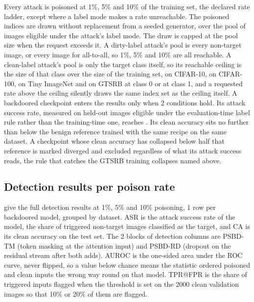 Every attack is poisoned at 1\%, 5\% and 10\% of the training set, the declared rate ladder, except where a label mode makes a rate unreachable. The poisoned indices are drawn without replacement from a seeded generator, over the pool of images eligible under the attack's label mode. The draw is capped at the pool size when the request exceeds it. A dirty-label attack's pool is every non-target image, or every image for all-to-all, so 1\%, 5\% and 10\% are all reachable. A clean-label attack's pool is only the target class itself, so its reachable ceiling is the size of that class over the size of the training set, \CleanLabelCapCifarOneZeroClassZero{} on CIFAR-10, \CleanLabelCapCifarOneZeroZeroClassZero{} on CIFAR-100, \CleanLabelCapTinyClassZero{} on Tiny ImageNet and \CleanLabelCapGtsrbClassZero{} on GTSRB at class 0 or \CleanLabelCapGtsrbClassOne{} at class 1, and a requested rate above the ceiling silently draws the same index set as the ceiling itself. A backdoored checkpoint enters the results only when 2 conditions hold. Its attack success rate, measured on held-out images eligible under the evaluation-time label rule rather than the training-time one, reaches \AsrBar{}. Its clean accuracy sits no further than \CleanDropBar{} below the benign reference trained with the same recipe on the same dataset. A checkpoint whose clean accuracy has collapsed below half that reference is marked diverged and excluded regardless of what its attack success reads, the rule that catches the GTSRB training collapses named above.

\subsection{Detection results per poison rate}
\label{app:results}

 give the full detection results at 1\%, 5\% and 10\% poisoning, 1 row per backdoored model, grouped by dataset. ASR is the attack success rate of the model, the share of triggered non-target images classified as the target, and CA is its clean accuracy on the test set. The 2 blocks of detection columns are PSBD-TM (token masking at the attention input) and PSBD-RD (dropout on the residual stream after both adds). AUROC is the one-sided area under the ROC curve, never flipped, so a value below chance means the statistic ordered poisoned and clean inputs the wrong way round on that model. TPR@FPR is the share of triggered inputs flagged when the threshold is set on the 2000 clean validation images so that 10\% or 20\% of them are flagged.

